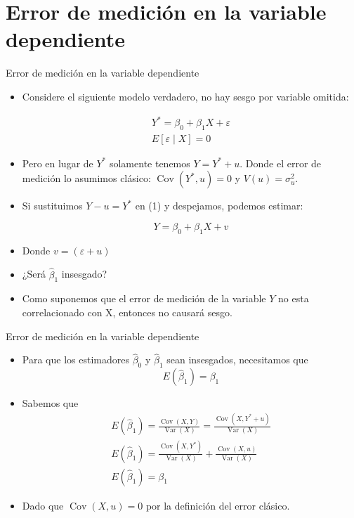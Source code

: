 \documentclass[10pt]{beamer}
\begin{document}
\section{Error de medición en la variable dependiente}

\begin{frame}{Error de medición en la variable dependiente}
    \begin{itemize}
        \item Considere el siguiente modelo verdadero,  no hay sesgo por variable omitida:

        \begin{eqnarray}
                                   Y^{*}=\beta_{0}+\beta_{1} X+\varepsilon\\
                                   E[\varepsilon \mid X]=0  \nonumber
       \end{eqnarray}
        \item Pero en lugar de $Y^{*}$ solamente tenemos $Y=Y^{*}+u$. Donde el error de medici\'on lo asumimos cl\'asico: $\operatorname{Cov}\left(Y^{*}, u\right)=0$ y $V(u)=\sigma_{u}^{2}$.
        \item Si sustituimos $Y-u=Y^{*}$ en (1) y despejamos, podemos estimar:

        \begin{equation}
             Y=\beta_{0}+\beta_{1} X+v        \end{equation}


        \item Donde $v=(\varepsilon+u)$
        \item ¿Ser\'a $\hat{\beta}_{1}$ insesgado?
        \item Como suponemos que el error de medici\'on de la variable $Y$ {\color{blue} no} esta correlacionado con X, entonces no causar\'a sesgo.
    \end{itemize}
\end{frame}

\begin{frame}{Error de medición en la variable dependiente}
    \begin{itemize}
              \item Para que los estimadores $\hat{\beta}_{0}$ y $\hat{\beta}_{1}$ sean insesgados, necesitamos que
        $$
        E\left(\hat{\beta}_{1}\right)=\beta_{1}
        $$
        \item Sabemos que
        $$
        \begin{gathered}
        E\left(\hat{\beta}_{1}\right)=\frac{\operatorname{Cov}(X, Y)}{\operatorname{Var}(X)}=\frac{\operatorname{Cov}\left(X, Y^{*}+u\right)}{\operatorname{Var}(X)} \\
        E\left(\hat{\beta}_{1}\right)=\frac{\operatorname{Cov}\left(X, Y^{*}\right)}{\operatorname{Var}(X)}+\frac{\operatorname{Cov}(X, u)}{\operatorname{Var}(X)} \\
        E\left(\hat{\beta}_{1}\right)=\beta_{1}
        \end{gathered}
        $$
        \item {\color{blue}Dado que $\operatorname{Cov}(X, u)=0$ por la definición del error clásico.}
    \end{itemize}
\end{frame}
\end{document}
